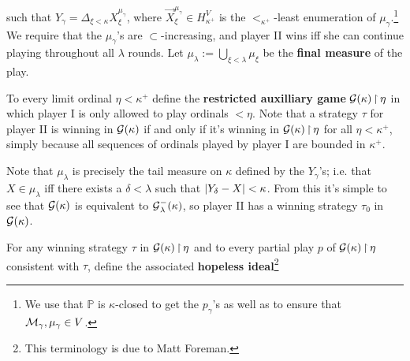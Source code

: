 \documentclass[../../main]{subfiles}
\begin{document}
{	such that $Y_\gamma=\Delta_{\xi<\kappa} X^{\mu_\gamma}_\xi$, where $\vec X^{\mu_\gamma}_\xi\in H_{\kappa^+}^V$ is the $<_{\kappa^+}$-least enumeration of $\mu_\gamma$.\footnote{We use that $\mathbb P$ is $\kappa$-closed to get the $p_\gamma$'s as well as to ensure that $\operatorname{\mathcal M}_\gamma,\mu_\gamma\in V$.} We require that the $\mu_\gamma$'s are $\subset$-increasing, and player II wins iff she can continue playing throughout all $\lambda$ rounds. Let $\mu_\lambda:=\bigcup_{\xi<\lambda}\mu_\xi$ be the \textbf{final measure} of the play.
	
	\qquad To every limit ordinal $\eta<\kappa^+$ define the \textbf{restricted auxilliary game} $\operatorname{\mathcal G}(\kappa)\operatorname{\upharpoonright}\eta$ in which player I is only allowed to play ordinals ${<}\eta$. Note that a strategy $\tau$ for player II is winning in $\operatorname{\mathcal G}(\kappa)$ if and only if it's winning in $\operatorname{\mathcal G}(\kappa)\operatorname{\upharpoonright}\eta$ for all $\eta<\kappa^+$, simply because all sequences of ordinals played by player I are bounded in $\kappa^+$.
	
	\qquad Note that $\mu_\lambda$ is precisely the tail measure on $\kappa$ defined by the $Y_\gamma$'s; i.e. that $X\in\mu_\lambda$ iff there exists a $\delta<\lambda$ such that $\left|Y_\delta-X\right|<\kappa$. From this it's simple to see that $\operatorname{\mathcal G}(\kappa)$ is equivalent to $\operatorname{\mathcal G}_\lambda^-(\kappa)$, so player II has a winning strategy $\tau_0$ in $\operatorname{\mathcal G}(\kappa)$. 
	
	\qquad For any winning strategy $\tau$ in $\operatorname{\mathcal G}(\kappa)\operatorname{\upharpoonright}\eta$ and to every partial play $p$ of $\operatorname{\mathcal G}(\kappa)\operatorname{\upharpoonright}\eta$ consistent with $\tau$, define the associated \textbf{hopeless ideal}\footnote{This terminology is due to Matt Foreman.}


	}
\end{document}
